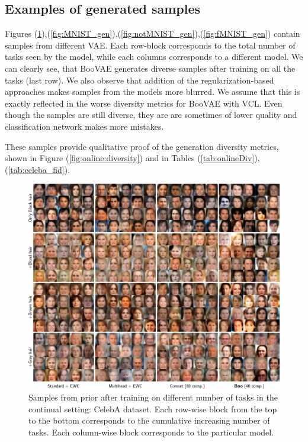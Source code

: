\clearpage
\subsection{Examples of generated samples} \label{app:samples}
Figures (\ref{fig:celeba_gen}),(\ref{fig:MNIST_gen}),(\ref{fig:notMNIST_gen}),(\ref{fig:fMNIST_gen}) contain samples from different VAE. Each row-block corresponds to the total number of tasks seen by the model, while each columns corresponds to a different model. We can clearly see, that BooVAE generates diverse samples after training on all the tasks (last row). We also observe that addition of the regularization-based approaches makes samples from the models more blurred. We assume that this is exactly reflected in the worse diversity metrics for BooVAE with VCL. Even though the samples are still diverse, they are are sometimes of lower quality and classification network makes more mistakes.  

These samples provide qualitative proof of the generation diversity metrics, shown in Figure (\ref{fig:online:diversity}) and in Tables (\ref{tab:onlineDiv}),(\ref{tab:celeba_fid}). 

\begin{figure}[ht]
		\centering
		\includegraphics[width=\textwidth]{pics/1_boovae/celeba_full.pdf}
		\caption{Samples from prior after training on different number of tasks in the continual setting: CelebA dataset. Each row-wise block from the top to the bottom corresponds to the cumulative increasing number of tasks. Each column-wise block corresponds to the particular model.}
		\label{fig:celeba_gen}
\end{figure}

